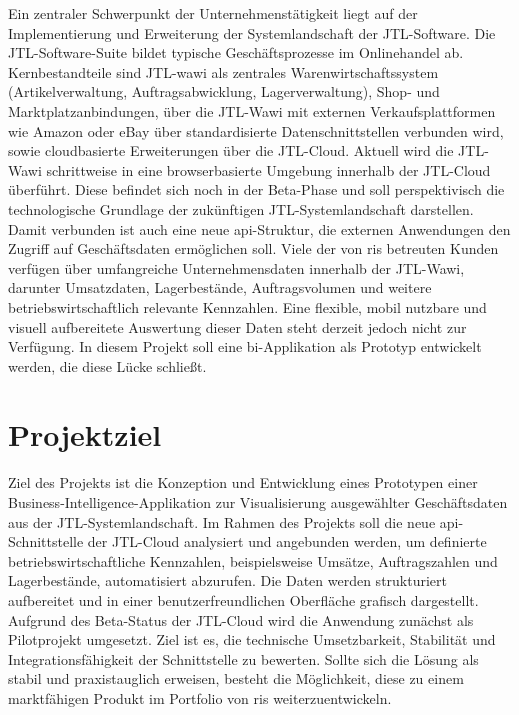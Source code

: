\documentclass[11pt, a4paper, oneside]{report}
\begin{document}
Ein zentraler Schwerpunkt der Unternehmenstätigkeit liegt auf der Implementierung und
Erweiterung der Systemlandschaft der JTL-Software. Die JTL-Software-Suite bildet typische
Geschäftsprozesse im Onlinehandel ab. Kernbestandteile sind JTL-\gls{wawi} als zentrales
Warenwirtschaftssystem (Artikelverwaltung, Auftragsabwicklung, Lagerverwaltung), Shop- und
Marktplatzanbindungen, über die JTL-Wawi mit externen Verkaufsplattformen wie Amazon oder eBay über standardisierte Datenschnittstellen verbunden wird, sowie cloudbasierte Erweiterungen über die JTL-Cloud.
Aktuell wird die JTL-Wawi schrittweise in eine browserbasierte Umgebung innerhalb der
JTL-Cloud überführt. Diese befindet sich noch in der Beta-Phase und soll perspektivisch
die technologische Grundlage der zukünftigen JTL-Systemlandschaft darstellen. Damit
verbunden ist auch eine neue \gls{api}-Struktur, die externen Anwendungen den Zugriff auf
Geschäftsdaten ermöglichen soll. Viele der von \gls{ris} betreuten Kunden verfügen über
umfangreiche Unternehmensdaten innerhalb der JTL-Wawi, darunter Umsatzdaten, Lagerbestände,
Auftragsvolumen und weitere betriebswirtschaftlich relevante Kennzahlen. Eine flexible,
mobil nutzbare und visuell aufbereitete Auswertung dieser Daten steht derzeit jedoch nicht
zur Verfügung.
In diesem Projekt soll eine \gls{bi}-Applikation als Prototyp entwickelt werden, die diese
Lücke schließt.

\section{Projektziel}

Ziel des Projekts ist die Konzeption und Entwicklung eines Prototypen einer
Business-Intelligence-Applikation zur Visualisierung ausgewählter Geschäftsdaten aus der
JTL-Systemlandschaft. Im Rahmen des Projekts soll die neue \gls{api}-Schnittstelle der
JTL-Cloud analysiert und angebunden werden, um definierte betriebswirtschaftliche Kennzahlen,
beispielsweise Umsätze, Auftragszahlen und Lagerbestände, automatisiert abzurufen.
Die Daten werden strukturiert aufbereitet und in einer benutzerfreundlichen Oberfläche
grafisch dargestellt.
Aufgrund des Beta-Status der JTL-Cloud wird die Anwendung zunächst als Pilotprojekt
umgesetzt. Ziel ist es, die technische Umsetzbarkeit, Stabilität und Integrationsfähigkeit
der Schnittstelle zu bewerten. Sollte sich die Lösung als stabil und praxistauglich
erweisen, besteht die Möglichkeit, diese zu einem marktfähigen Produkt im Portfolio von
\gls{ris} weiterzuentwickeln.
\end{document}
